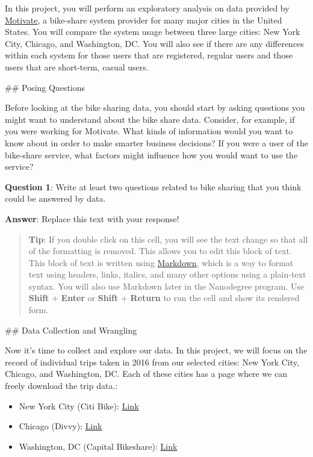\documentclass[11pt]{article}
\providecommand{\tightlist}{%
      \setlength{\itemsep}{0pt}\setlength{\parskip}{0pt}}
\begin{document}
In this project, you will perform an exploratory analysis on data
provided by \href{https://www.motivateco.com/}{Motivate}, a bike-share
system provider for many major cities in the United States. You will
compare the system usage between three large cities: New York City,
Chicago, and Washington, DC. You will also see if there are any
differences within each system for those users that are registered,
regular users and those users that are short-term, casual users.

     \#\# Posing Questions

Before looking at the bike sharing data, you should start by asking
questions you might want to understand about the bike share data.
Consider, for example, if you were working for Motivate. What kinds of
information would you want to know about in order to make smarter
business decisions? If you were a user of the bike-share service, what
factors might influence how you would want to use the service?

\textbf{Question 1}: Write at least two questions related to bike
sharing that you think could be answered by data.

\textbf{Answer}: Replace this text with your response!

\begin{quote}
\textbf{Tip}: If you double click on this cell, you will see the text
change so that all of the formatting is removed. This allows you to edit
this block of text. This block of text is written using
\href{http://daringfireball.net/projects/markdown/syntax}{Markdown},
which is a way to format text using headers, links, italics, and many
other options using a plain-text syntax. You will also use Markdown
later in the Nanodegree program. Use \textbf{Shift} + \textbf{Enter} or
\textbf{Shift} + \textbf{Return} to run the cell and show its rendered
form.
\end{quote}

     \#\# Data Collection and Wrangling

Now it's time to collect and explore our data. In this project, we will
focus on the record of individual trips taken in 2016 from our selected
cities: New York City, Chicago, and Washington, DC. Each of these cities
has a page where we can freely download the trip data.:

\begin{itemize}
\tightlist
\item
  New York City (Citi Bike):
  \href{https://www.citibikenyc.com/system-data}{Link}
\item
  Chicago (Divvy): \href{https://www.divvybikes.com/system-data}{Link}
\item
  Washington, DC (Capital Bikeshare):
  \href{https://www.capitalbikeshare.com/system-data}{Link}
\end{itemize}
\end{document}
